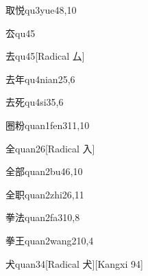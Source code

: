 \begin{verbete}{取悦}{qu3yue4}{8,10}
\end{verbete}

\begin{verbete}{厺}{qu4}{5}
\end{verbete}

\begin{verbete}{去}{qu4}{5}[Radical 厶]
\end{verbete}

\begin{verbete}{去年}{qu4nian2}{5,6}
\end{verbete}

\begin{verbete}{去死}{qu4si3}{5,6}
\end{verbete}

\begin{verbete}{圈粉}{quan1fen3}{11,10}
\end{verbete}

\begin{verbete}{全}{quan2}{6}[Radical 入]
\end{verbete}

\begin{verbete}{全部}{quan2bu4}{6,10}
\end{verbete}

\begin{verbete}{全职}{quan2zhi2}{6,11}
\end{verbete}

\begin{verbete}{拳法}{quan2fa3}{10,8}
\end{verbete}

\begin{verbete}{拳王}{quan2wang2}{10,4}
\end{verbete}

\begin{verbete}{犬}{quan3}{4}[Radical 犬][Kangxi 94]
\end{verbete}

